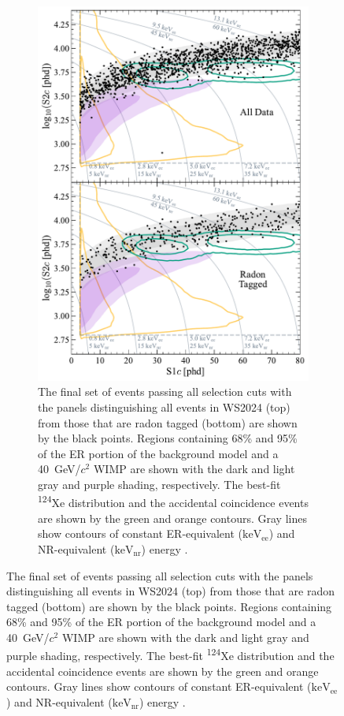 \begin{figure}[!ht]
	\centering
	\begin{subfigure}[b]{0.49\textwidth}
		\centering
		\includegraphics[width=\textwidth]{figures/WS2024Result/figure3.pdf}
        \caption{The final set of events passing all selection cuts with the panels distinguishing all events in WS2024 (top) from those that are radon tagged (bottom) are shown by the black points. Regions containing 68\% and 95\% of the ER portion of the background model and a 40~GeV/$c^2$ WIMP are shown with the dark and light gray and purple shading, respectively. The best-fit \textsuperscript{124}Xe distribution and the accidental coincidence events are shown by the green and orange contours. Gray lines show contours of constant ER-equivalent ($\text{keV}_\text{ee}$) and NR-equivalent ($\text{keV}_\text{nr}$) energy \cite{LZCollaboration:2024lux}.}
		\label{fig:WS2024Result/fig3}
	\end{subfigure}

\end{figure}
